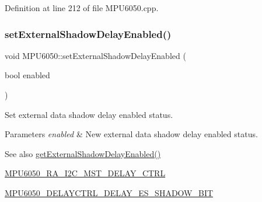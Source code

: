 Definition at line 212 of file M\+P\+U6050.\+cpp.


\begin{DoxyCode}{0}

\end{DoxyCode}
\mbox{\label{classMPU6050_a9160193d883871037c6535a9d3e02ee2}} 
\subsubsection{\texorpdfstring{setExternalShadowDelayEnabled()}{setExternalShadowDelayEnabled()}}
{\footnotesize\ttfamily void M\+P\+U6050\+::set\+External\+Shadow\+Delay\+Enabled (\begin{DoxyParamCaption}\item[{bool}]{enabled }\end{DoxyParamCaption})}

Set external data shadow delay enabled status. 
\begin{DoxyParams}{Parameters}
{\em enabled} & New external data shadow delay enabled status. \\
\hline
\end{DoxyParams}
\begin{DoxySeeAlso}{See also}
\mbox{\hyperlink{classMPU6050_a0e5cb13838298609b5260fd1558f8c92}{get\+External\+Shadow\+Delay\+Enabled()}} 

\mbox{\hyperlink{MPU6050_8h_a95960b2c82d00341b6174272e2fb3e07}{M\+P\+U6050\+\_\+\+R\+A\+\_\+\+I2\+C\+\_\+\+M\+S\+T\+\_\+\+D\+E\+L\+A\+Y\+\_\+\+C\+T\+RL}} 

\mbox{\hyperlink{MPU6050_8h_a77b25de3f3dbdb1aec3201cab7d88980}{M\+P\+U6050\+\_\+\+D\+E\+L\+A\+Y\+C\+T\+R\+L\+\_\+\+D\+E\+L\+A\+Y\+\_\+\+E\+S\+\_\+\+S\+H\+A\+D\+O\+W\+\_\+\+B\+IT}} 
\end{DoxySeeAlso}


